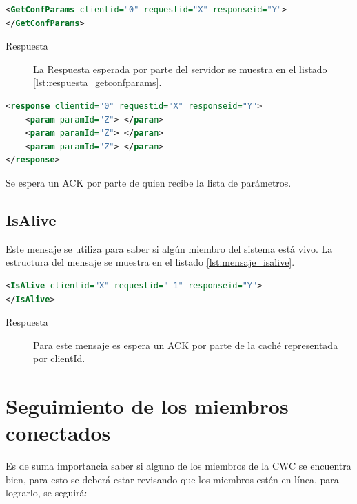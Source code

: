 \begin{lstlisting}[language=XML,caption={Mensaje de GetConfParams},label={lst:mensaje_getconfparams}]
<GetConfParams clientid="0" requestid="X" responseid="Y"> 
</GetConfParams>
\end{lstlisting}


\begin{description}
\item[Respuesta] La Respuesta esperada por parte del servidor se muestra en el listado \ref{lst:respuesta_getconfparams}.
\end{description}

\begin{lstlisting}[language=XML,caption={Mensaje de Respuesta de GetConfParams},label={lst:respuesta_getconfparams}]
<response clientid="0" requestid="X" responseid="Y"> 
	<param paramId="Z"> </param>
	<param paramId="Z"> </param>
	<param paramId="Z"> </param>
</response>
\end{lstlisting}


Se espera un ACK por parte de quien recibe la lista de parámetros.

\subsection{IsAlive}

Este mensaje se utiliza para saber si algún miembro del sistema está vivo. La estructura del mensaje se muestra en el listado \ref{lst:mensaje_isalive}.

\begin{lstlisting}[language=XML,caption={Mensaje de IsAlive},label={lst:mensaje_isalive}]
<IsAlive clientid="X" requestid="-1" responseid="Y"> 
</IsAlive>
\end{lstlisting}

\begin{description}
\item[Respuesta] Para este mensaje es espera un ACK por parte de la caché representada por clientId.
\end{description}

\section{Seguimiento de los miembros conectados}

Es de suma importancia saber si alguno de los miembros de la CWC se encuentra bien, para esto se deberá estar revisando que los miembros estén en línea, para lograrlo, se seguirá:

